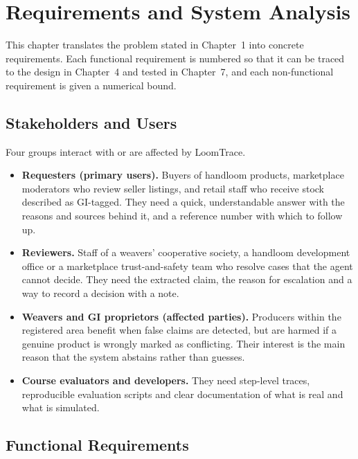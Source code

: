 \chapter{Requirements and System Analysis}

This chapter translates the problem stated in Chapter~1 into concrete requirements. Each functional
requirement is numbered so that it can be traced to the design in Chapter~4 and tested in Chapter~7,
and each non-functional requirement is given a numerical bound.

\section{Stakeholders and Users}

Four groups interact with or are affected by LoomTrace.

\begin{itemize}[itemsep=2pt]
\item \textbf{Requesters (primary users).} Buyers of handloom products, marketplace moderators who
review seller listings, and retail staff who receive stock described as GI-tagged. They need a quick,
understandable answer with the reasons and sources behind it, and a reference number with which to
follow up.
\item \textbf{Reviewers.} Staff of a weavers' cooperative society, a handloom development office or a
marketplace trust-and-safety team who resolve cases that the agent cannot decide. They need the
extracted claim, the reason for escalation and a way to record a decision with a note.
\item \textbf{Weavers and GI proprietors (affected parties).} Producers within the registered area
benefit when false claims are detected, but are harmed if a genuine product is wrongly marked as
conflicting. Their interest is the main reason that the system abstains rather than guesses.
\item \textbf{Course evaluators and developers.} They need step-level traces, reproducible evaluation
scripts and clear documentation of what is real and what is simulated.
\end{itemize}

\section{Functional Requirements}


